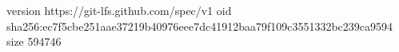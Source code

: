 version https://git-lfs.github.com/spec/v1
oid sha256:ec7f5cbe251aae37219b40976eee7dc41912baa79f109c3551332bc239ca9594
size 594746
